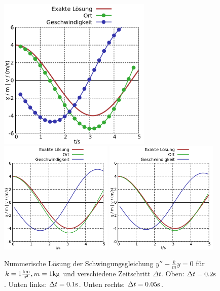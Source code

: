 \begin{figure}
    \centering
    \includegraphics[width=0.65\textwidth]{./img/oscillation_dt_large}
    \includegraphics[width=0.48\textwidth]{./img/oscillation_dt_small}
    \includegraphics[width=0.48\textwidth]{./img/oscillation_dt_smallest}
    \caption[Nummerische Lösung der Schwingungsgleichung]{Nummerische Lösung der Schwingungsgleichung $y''-\frac{k}{m}y = 0$ für $k=1 \frac{\text{km}}{\text{s}^2}, m=1 \text{kg}$ und verschiedene Zeitschritt $\Delta t$. Oben: $\Delta t=0.2\text{s}$. Unten links: $\Delta t=0.1\text{s}$. Unten rechts: $\Delta t=0.05\text{s}$.}
    \label{fig:DeqNumSolve}
\end{figure}

